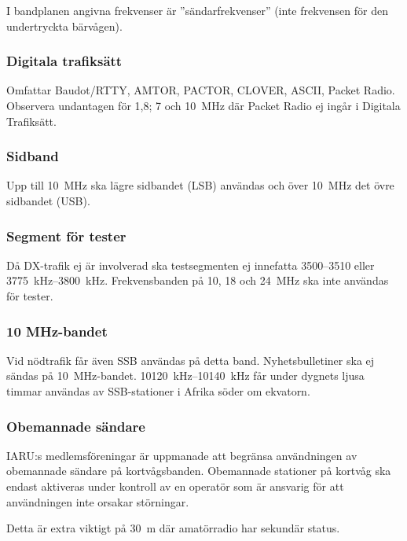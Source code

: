 I bandplanen angivna frekvenser är ''sändarfrekvenser''
(inte frekvensen för den undertryckta bärvågen).

\subsubsection{Digitala trafiksätt}

Omfattar Baudot/RTTY, AMTOR, PACTOR, CLOVER, ASCII, Packet Radio.
Observera undantagen för 1,8; 7 och \qty{10}{\mega\hertz} där Packet Radio ej
ingår i Digitala Trafiksätt.

\subsubsection{Sidband}

Upp till \qty{10}{\mega\hertz} ska lägre sidbandet (LSB) användas och över
\qty{10}{\mega\hertz} det övre sidbandet (USB).

\subsubsection{Segment för tester}

Då DX-trafik ej är involverad ska testsegmenten ej innefatta
3500--3510 eller \SIrange{3775}{3800}{\kilo\hertz}.
Frekvensbanden på 10, 18 och \qty{24}{\mega\hertz} ska inte användas för tester.

\subsubsection{10 MHz-bandet}

Vid nödtrafik får även SSB användas på detta band.
Nyhetsbulletiner ska ej sändas på \qty{10}{\mega\hertz}-bandet.
\SIrange{10120}{10140}{\kilo\hertz} får under dygnets ljusa timmar användas av
SSB-stationer i Afrika söder om ekvatorn.

\subsubsection{Obemannade sändare}

IARU:s medlemsföreningar är uppmanade att begränsa användningen av obemannade
sändare på kortvågsbanden.
Obemannade stationer på kortvåg ska endast aktiveras under kontroll av en
operatör som är ansvarig för att användningen inte orsakar störningar.

Detta är extra viktigt på \qty{30}{\metre} där amatörradio har sekundär status.

